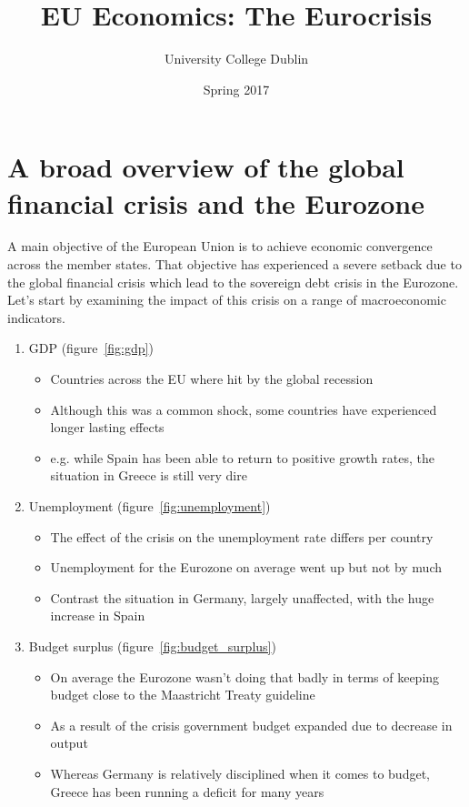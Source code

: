 \documentclass{tufte-handout}
\title{EU Economics: The Eurocrisis}
\author{University College Dublin}
\date{Spring 2017}
\begin{document}
\maketitle  
\section{A broad overview of the global financial crisis and the Eurozone}
A main objective of the European Union is to achieve economic convergence across the member states. 
That objective has experienced a severe setback due to the global financial crisis which lead to the sovereign debt crisis in the Eurozone. 
Let's start by examining the impact of this crisis on a range of macroeconomic indicators. 
\begin{enumerate}
  \item GDP (figure~\ref{fig:gdp})
  \begin{itemize}
    \item Countries across the EU where hit by the global recession
    \item Although this was a common shock, some countries have experienced longer lasting effects
    \item e.g. while Spain has been able to return to positive growth rates, the situation in Greece is still very dire
  \end{itemize}
  \item Unemployment (figure~\ref{fig:unemployment})
  \begin{itemize}
    \item The effect of the crisis on the unemployment rate differs per country
    \item Unemployment for the Eurozone on average went up but not by much
    \item Contrast the situation in Germany, largely unaffected, with the huge increase in Spain
  \end{itemize}
  \item Budget surplus (figure~\ref{fig:budget_surplus})
  \begin{itemize}
    \item On average the Eurozone wasn't doing that badly in terms of keeping budget close to the Maastricht Treaty guideline
    \item As a result of the crisis government budget expanded due to decrease in output
    \item Whereas Germany is relatively disciplined when it comes to budget, Greece has been running a deficit for many years

\end{itemize}
\end{enumerate}
\end{document}
